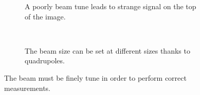 \begin{figure}[!ht]
  \begin{subfigure}[t]{0.5\textwidth}
    
    \caption{A poorly beam tune leads to strange signal on the top of the image.}
    \label{chap4:beam_tuning_a}
  \end{subfigure}
  ~
  \begin{subfigure}[t]{0.5\textwidth}
    
    \caption{The beam size can be set at different sizes thanks to quadrupoles.}
    \label{chap4:beam_tuning_b}
  \end{subfigure}
  \caption[The beam must be finely tune in order to perform correct measurements]{The beam must be finely tune in order to perform correct measurements.}
  \label{chap4:beam_tuning}
\end{figure}

